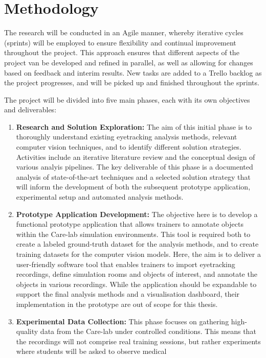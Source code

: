 \documentclass[english]{hogent-article}
\begin{document}
\section{Methodology}
\label{sec:methodology}

The research will be conducted in an Agile manner, whereby iterative cycles (sprints) will be employed 
to ensure flexibility and continual improvement throughout the project.
This approach ensures that different aspects of the project van be developed and refined in parallel, 
as well as allowing for changes based on feedback and interim results.
New tasks are added to a Trello backlog as the project progresses, and will be picked up and finished throughout the sprints.

The project will be divided into five main phases, each with its own objectives and deliverables: 
\begin{enumerate}
    \item \textbf{Research and Solution Exploration:} 
    The aim of this initial phase is to thoroughly understand existing eyetracking analysis methods, 
    relevant computer vision techniques, and to identify different solution strategies. 
    Activities include an iterative literature review and the conceptual design of various analyis pipelines.
    The key deliverable of this phase is a documented analysis of state-of-the-art techniques and a selected solution strategy 
    that will inform the development of both the subsequent prototype application, experimental setup and automated analysis methods.
    \item \textbf{Prototype Application Development:}
    The objective here is to develop a functional prototype application that allows trainers to annotate objects within the Care-lab simulation environments.
    This tool is required both to create a labeled ground-truth dataset for the analysis methods, and to create training datasets for the computer vision models.
    Here, the aim is to deliver a user-friendly software tool that enables trainers to import eyetracking recordings, define simulation rooms and objects of interest, and annotate the objects in various recordings.
    While the application should be expandable to support the final analysis methods and a visualisation dashboard, their implementation in the prototype are out of scope for this thesis.
    \item \textbf{Experimental Data Collection:}
    This phase focuses on gathering high-quality data from the Care-lab under controlled conditions. 
    This means that the recordings will not comprise real training sessions, but rather experiments where students will be asked to observe medical 

\end{enumerate}
\end{document}

